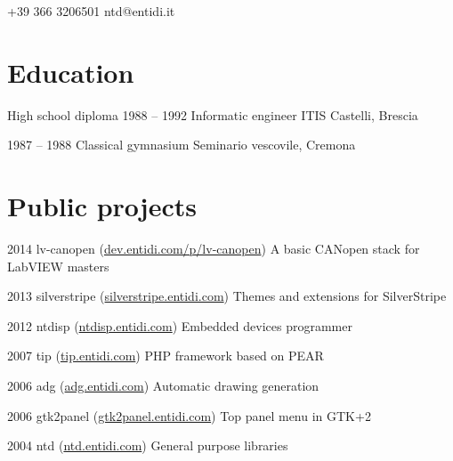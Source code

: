 \documentclass[fontsize=10pt]{tccv}
\begin{document}
    {+39 366 3206501}
    {ntd@entidi.it}

\section{Education}

\begin{yearlist}

\item[High school diploma]{1988 -- 1992}
     {Informatic engineer}
     {ITIS Castelli, Brescia}

\item{1987 -- 1988}
     {Classical gymnasium}
     {Seminario vescovile, Cremona}

\end{yearlist}

\section{Public projects}

\begin{yearlist}

\item{2014}
     {lv-canopen (\href{http://dev.entidi.com/p/lv-canopen}{dev.entidi.com/p/lv-canopen})}
     {A basic CANopen stack for LabVIEW masters}

\item{2013}
     {silverstripe (\href{http://silverstripe.entidi.com/}{silverstripe.entidi.com})}
     {Themes and extensions for SilverStripe}

\item{2012}
     {ntdisp (\href{http://ntdisp.entidi.com/}{ntdisp.entidi.com})}
     {Embedded devices programmer}

\item{2007}
     {tip (\href{http://tip.entidi.com/}{tip.entidi.com})}
     {PHP framework based on PEAR}

\item{2006}
     {adg (\href{http://adg.entidi.com/}{adg.entidi.com})}
     {Automatic drawing generation}

\item{2006}
     {gtk2panel (\href{http://gtk2panel.entidi.com/}{gtk2panel.entidi.com})}
     {Top panel menu in GTK+2}

\item{2004}
     {ntd (\href{http://ntd.entidi.com/}{ntd.entidi.com})}
     {General purpose libraries}

\end{yearlist}
\end{document}
